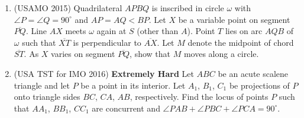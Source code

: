 \documentclass[11pt]{scrartcl}
\begin{document}
\begin{enumerate}

\item (USAMO 2015) Quadrilateral $APBQ$ is inscribed in circle $\omega$ with $\angle P = \angle Q = 90^{\circ}$ and $AP = AQ < BP$. Let $X$ be a variable point on segment $\overline{PQ}$. Line $AX$ meets $\omega$ again at $S$ (other than $A$). Point $T$ lies on arc $AQB$ of $\omega$ such that $\overline{XT}$ is perpendicular to $\overline{AX}$. Let $M$ denote the midpoint of chord $\overline{ST}$. As $X$ varies on segment $\overline{PQ}$, show that $M$ moves along a circle.

\item (USA TST for IMO 2016) \textbf{Extremely Hard} Let $ABC$ be an acute scalene triangle and let $P$ be a point in its interior. Let $A_1$, $B_1$, $C_1$ be projections of $P$ onto triangle sides $BC$, $CA$, $AB$, respectively. Find the locus of points $P$ such that $AA_1$, $BB_1$, $CC_1$ are concurrent and $\angle PAB + \angle PBC + \angle PCA = 90^{\circ}$.
 \end{enumerate}
 
\end{document}
